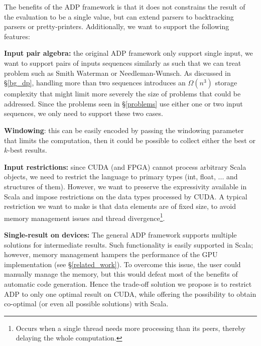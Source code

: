 The benefits of the ADP framework is that it does not constrains the result of the evaluation to be a single value, but can extend parsers to backtracking parsers or pretty-printers. Additionally, we want to support the following features:\ol
\item \textbf{Input pair algebra:} the original ADP framework \cite{adp} only support single input, we want to support pairs of inputs sequences similarly as \cite{gapl} such that we can treat problem such as Smith Waterman or Needleman-Wunsch. As discussed in \S\ref{bg_dp}, handling more than two sequences introduces an $\Omega(n^3)$ storage complexity that might limit more severely the size of problems that could be addressed. Since the problems seen in \S\ref{problems} use either one or two input sequences, we only need to support these two cases.
\item \textbf{Windowing}: this can be easily encoded by passing the windowing parameter that limits the computation, then it could be possible to collect either the best or $k$-best results.
\item \textbf{Input restrictions:} since CUDA (and FPGA) cannot process arbitrary Scala objects, we need to restrict the language to primary types (int, float, ... and structures of them). However, we want to preserve the expressivity available in Scala and impose restrictions on the data types processed by CUDA. A typical restriction we want to make is that data elements are of fixed size, to avoid memory management issues and thread divergence\footnote{Occurs when a single thread needs more processing than its peers, thereby delaying the whole computation.}.
\item \textbf{Single-result on devices:} The general ADP framework supports multiple solutions for intermediate results. Such functionality is easily supported in Scala; however, memory management hampers the performance of the GPU implementation (see \S\ref{related_work}). To overcome this issue, the user could manually manage the memory, but this would defeat most of the benefits of automatic code generation. Hence the trade-off solution we propose is to restrict ADP to only one optimal result on CUDA, while offering the possibility to obtain co-optimal (or even all possible solutions) with Scala.

